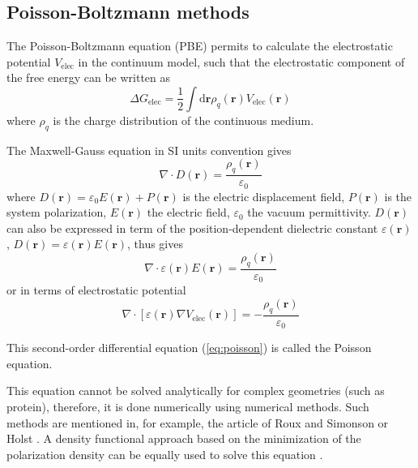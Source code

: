 \subsection{Poisson-Boltzmann methods\label{sub:Poisson=002013Boltzmann-methods}}

The Poisson-Boltzmann equation (PBE) \citep{holst_1994_poisson} permits
to calculate the electrostatic potential $V_{\mathrm{elec}}$ in the
continuum model, such that the electrostatic component of the free
energy can be written as
\begin{equation}
\Delta G_{\mathrm{elec}}=\frac{1}{2}\int\mathrm{d}\mathbf{r}\rho_{q}(\mathbf{r})V_{\mathrm{elec}}(\mathbf{r})
\end{equation}
where $\rho_{q}$ is the charge distribution of the continuous medium.

The Maxwell-Gauss equation in SI units convention gives 
\begin{equation}
\nabla\cdot D(\mathbf{r})=\dfrac{\rho_{q}(\mathbf{r})}{\varepsilon_{0}}
\end{equation}
where $D(\mathbf{r})=\varepsilon_{0}E(\mathbf{r})+P(\mathbf{r})$
is the electric displacement field, $P(\mathbf{r})$ is the system
polarization, $E(\mathbf{r})$ the electric field, $\varepsilon_{0}$
the vacuum permittivity. $D(\mathbf{r})$ can also be expressed in
term of the position-dependent dielectric constant $\varepsilon(\mathbf{r})$,
$D(\mathbf{r})=\varepsilon(\mathbf{r})E(\mathbf{r})$, thus gives
\begin{equation}
\nabla\cdot\varepsilon(\mathbf{r})E(\mathbf{r})=\dfrac{\rho_{q}(\mathbf{r})}{\varepsilon_{0}}
\end{equation}
or in terms of electrostatic potential 
\begin{equation}
\nabla\cdot\left[\varepsilon(\mathbf{r})\nabla V_{\mathrm{elec}}(\mathbf{r})\right]=-\dfrac{\rho_{q}(\mathbf{r})}{\varepsilon_{0}}\label{eq:poisson}
\end{equation}


This second-order differential equation (\ref{eq:poisson}) is called
the Poisson equation. 

This equation cannot be solved analytically for complex geometries
(such as protein), therefore, it is done numerically using numerical
methods. Such methods are mentioned in, for example, the article of
Roux and Simonson \citep{roux_implicit_1999} or Holst \citep{holst_1994_poisson}.
A density functional approach based on the minimization of the polarization
density can be equally used to solve this equation \citep{Marchi_2001,Levy_2005}.

